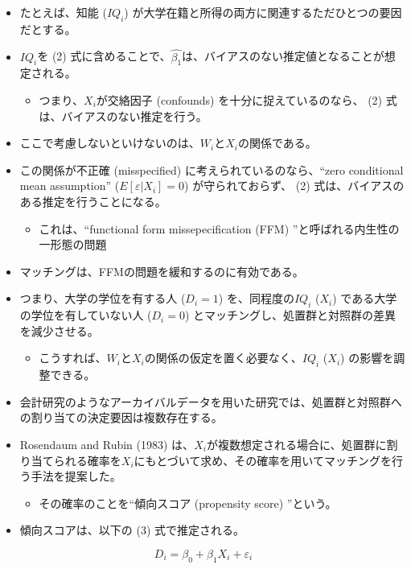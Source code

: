 \begin{itemize}
 \item たとえば、知能 ($IQ_i$) が大学在籍と所得の両方に関連するただひとつの要因だとする。
 \item $IQ_i$を (2) 式に含めることで、$\hat{\beta_1}$は、バイアスのない推定値となることが想定される。
  \begin{itemize}
   \item つまり、$X_i$が交絡因子 (confounds) を十分に捉えているのなら、 (2) 式は、バイアスのない推定を行う。
  \end{itemize}
 \item ここで考慮しないといけないのは、$W_i$と$X_i$の関係である。
 \item この関係が不正確 (misspecified) に考えられているのなら、“zero conditional mean assumption” ($E[\varepsilon | X_i] = 0$) が守られておらず、 (2) 式は、バイアスのある推定を行うことになる。
  \begin{itemize}
   \item これは、``functional form missepecification (FFM) ''と呼ばれる内生性の一形態の問題
  \end{itemize}
\item マッチングは、FFMの問題を緩和するのに有効である。
 \item つまり、大学の学位を有する人 ($D_i=1$) を、同程度の$IQ_i$ ($X_i$) である大学の学位を有していない人 ($D_i=0$) とマッチングし、処置群と対照群の差異を減少させる。
  \begin{itemize}
   \item こうすれば、$W_i$と$X_i$の関係の仮定を置く必要なく、$IQ_i$ ($X_i$) の影響を調整できる。
  \end{itemize}
 \item 会計研究のようなアーカイバルデータを用いた研究では、処置群と対照群への割り当ての決定要因は複数存在する。
 \item Rosendaum and Rubin (1983) は、$X_i$が複数想定される場合に、処置群に割り当てられる確率を$X_i$にもとづいて求め、その確率を用いてマッチングを行う手法を提案した。
  \begin{itemize}
   \item その確率のことを``傾向スコア (propensity score) ''という。
  \end{itemize}
\item 傾向スコアは、以下の (3) 式で推定される。
\end{itemize}

\begin{equation}
D_i = \beta_0 + \beta_1 X_i + \varepsilon_i
\end{equation}

